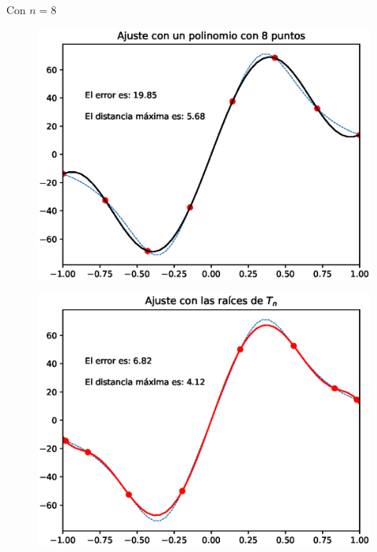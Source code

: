 \documentclass[12pt]{article}
\numberwithin{equation}{section}
\begin{document}
Con $n = 8$
\\
\begin{minipage}{0.45\linewidth}
    \begin{figure}[H]
    \centering
    \includegraphics[scale=0.44]{Imagenes/Interpolacion_Chebychev_08_Polinomio.eps}
    \end{figure}       
\end{minipage}
\hspace{0.1cm}
\begin{minipage}{0.45\linewidth}
\begin{figure}[H]
    \centering
    \includegraphics[scale=0.44]{Imagenes/Interpolacion_Chebychev_08_Raices.eps}
\end{figure}
\end{minipage}
\end{document}
